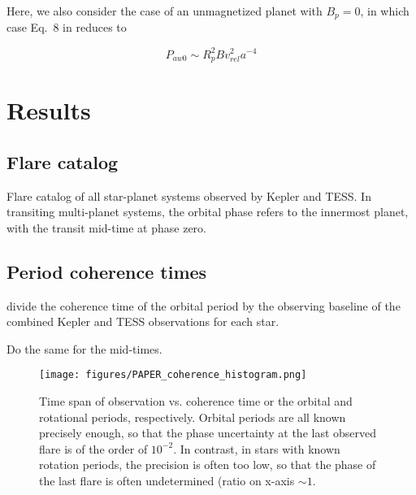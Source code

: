 \documentclass[twocolumn]{aastex631}
\begin{document}
Here, we also consider the case of an unmagnetized planet with $B_p=0$, in which case Eq.~8 in \cite{kavanagh2022radio} reduces to

\begin{equation}
    P_{aw0} \sim R_p^2  B  v_{rel}^2  a^{-4}
\end{equation}


\section{Results}
\label{sec:results}

\subsection{Flare catalog}

\begin{table*}
    \centering
            \caption{
            Flare catalog of all star-planet systems observed by Kepler and TESS. In transiting multi-planet systems, the orbital phase refers to the innermost planet, with the transit mid-time at phase zero. 
        }
    
        \label{fig:random_numbers}
\end{table*}

\subsection{Period coherence times}

divide the coherence time of the orbital period by the observing baseline of the combined Kepler and TESS observations for each star.

Do the same for the mid-times.

\begin{figure}[ht!]
    \begin{centering}
        \texttt{[image: figures/PAPER\_coherence\_histogram.png]}
        \caption{
           Time span of observation vs. coherence time or the orbital and rotational periods, respectively. Orbital periods are all known precisely enough, so that the phase uncertainty at the last observed flare is of the order of $10^{-2}$. In contrast, in stars with known rotation periods, the precision is often too low, so that the phase of the last flare is often undetermined (ratio on x-axis $\sim 1$.
        }
        \label{fig:coherence_hist}
    \end{centering}
\end{figure}
\end{document}
